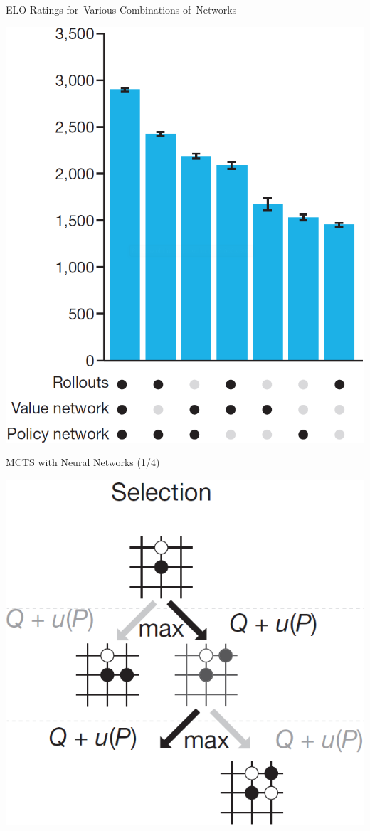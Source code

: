 \documentclass{beamer}
\begin{document}
{    \begin{frame}{ELO Ratings for~Various Combinations of~Networks}
      \begin{center}
        \includegraphics[height=.85\textheight]{../img/ELO_ratings_various_combinations_of_ANNs.png}
      \end{center}
    \end{frame}

    \begin{frame}{MCTS with Neural Networks (1/4)}
      \begin{center}
        \includegraphics[height=.85\textheight]{../img/MCTS_selection.png}
      \end{center}
    \end{frame}

}
\end{document}
